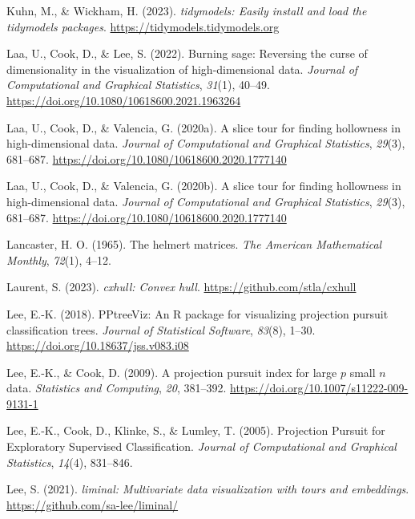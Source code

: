 \documentclass[
  letterpaper,
]{krantz}
\newlength{\cslhangindent}
\newenvironment{CSLReferences}[2] %
 {\begin{list}{}{%
  \setlength{\itemindent}{0pt}
  \setlength{\leftmargin}{0pt}
  \setlength{\parsep}{0pt}
  \ifodd #1
   \setlength{\leftmargin}{\cslhangindent}
   \setlength{\itemindent}{-1\cslhangindent}
  \fi
  \setlength{\itemsep}{#2\baselineskip}}}
 {\end{list}}
\begin{document}
\begin{CSLReferences}{1}{0}
Kuhn, M., \& Wickham, H. (2023). \emph{{tidymodels}: Easily install and
load the tidymodels packages}. \url{https://tidymodels.tidymodels.org}

Laa, U., Cook, D., \& Lee, S. (2022). Burning sage: Reversing the curse
of dimensionality in the visualization of high-dimensional data.
\emph{Journal of Computational and Graphical Statistics}, \emph{31}(1),
40--49. \url{https://doi.org/10.1080/10618600.2021.1963264}

Laa, U., Cook, D., \& Valencia, G. (2020a). A slice tour for finding
hollowness in high-dimensional data. \emph{Journal of Computational and
Graphical Statistics}, \emph{29}(3), 681--687.
\url{https://doi.org/10.1080/10618600.2020.1777140}

Laa, U., Cook, D., \& Valencia, G. (2020b). A slice tour for finding
hollowness in high-dimensional data. \emph{Journal of Computational and
Graphical Statistics}, \emph{29}(3), 681--687.
\url{https://doi.org/10.1080/10618600.2020.1777140}

Lancaster, H. O. (1965). The helmert matrices. \emph{The American
Mathematical Monthly}, \emph{72}(1), 4--12.

Laurent, S. (2023). \emph{{cxhull}: Convex hull}.
\url{https://github.com/stla/cxhull}

Lee, E.-K. (2018). PPtreeViz: An {R} package for visualizing projection
pursuit classification trees. \emph{Journal of Statistical Software},
\emph{83}(8), 1--30. \url{https://doi.org/10.18637/jss.v083.i08}

Lee, E.-K., \& Cook, D. (2009). A projection pursuit index for large
\(p\) small \(n\) data. \emph{Statistics and Computing}, \emph{20},
381--392. \url{https://doi.org/10.1007/s11222-009-9131-1}

Lee, E.-K., Cook, D., Klinke, S., \& Lumley, T. (2005). {P}rojection
{P}ursuit for {E}xploratory {S}upervised {C}lassification. \emph{Journal
of Computational and Graphical Statistics}, \emph{14}(4), 831--846.

Lee, S. (2021). \emph{{liminal}: Multivariate data visualization with
tours and embeddings}. \url{https://github.com/sa-lee/liminal/}


\end{CSLReferences}
\end{document}

